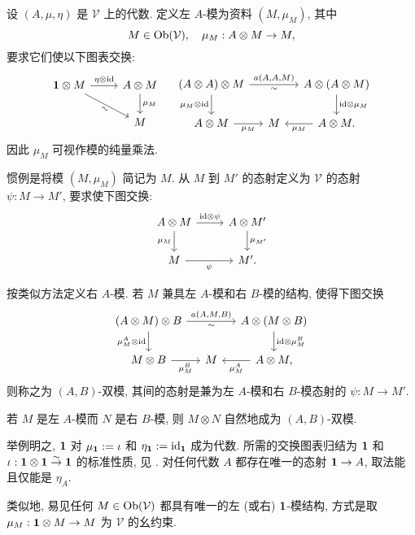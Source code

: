 \begin{definition}[模]\label{def:module-algebra}
	设 $(A, \mu, \eta)$ 是 $\mathcal{V}$ 上的代数. 定义左 $A$-模为资料 $(M, \mu_M)$, 其中
	\[ M \in \operatorname{Ob}(\mathcal{V}), \quad \mu_M: A \otimes M \to M, \]
	要求它们使以下图表交换:
	\[\begin{tikzcd}
		\munit \otimes M \arrow[r, "{\eta \otimes \identity}"] \arrow[rd, "\sim"' sloped] & A \otimes M \arrow[d, "{\mu_M}"] \\
		& M
	\end{tikzcd} \quad \begin{tikzcd}[column sep=small]
		(A \otimes A) \otimes M \arrow[rr, "{a(A, A, M)}", "\sim"'] \arrow[d, "{\mu_M \otimes \identity}"'] & & A \otimes (A \otimes M) \arrow[d, "{\identity \otimes \mu_M}"] \\
		A \otimes M \arrow[r, "{\mu_M}"'] & M & A \otimes M \arrow[l, "{\mu_M}"] .
	\end{tikzcd}\]
	因此 $\mu_M$ 可视作模的纯量乘法.
	
	惯例是将模 $(M, \mu_M)$ 简记为 $M$. 从 $M$ 到 $M'$ 的态射定义为 $\mathcal{V}$ 的态射 $\psi: M \to M'$, 要求使下图交换:
	\[\begin{tikzcd}
		A \otimes M \arrow[d, "{\mu_M}"'] \arrow[r, "{\identity \otimes \psi}"] & A \otimes M' \arrow[d, "{\mu_{M'}}"] \\
		M \arrow[r, "\psi"'] & M' .
	\end{tikzcd}\]
	
	按类似方法定义右 $A$-模. 若 $M$ 兼具左 $A$-模和右 $B$-模的结构, 使得下图交换
	\[\begin{tikzcd}[column sep=small]
		(A \otimes M) \otimes B \arrow[rr, "{a(A, M, B)}", "\sim"'] \arrow[d, "{\mu_M^A \otimes \identity}"'] & & A \otimes (M \otimes B) \arrow[d, "{\identity \otimes \mu_M^B}"] \\
		M \otimes B \arrow[r, "{\mu_M^B}"'] & M & A \otimes M , \arrow[l, "{\mu_M^A}"]
	\end{tikzcd}\]
	则称之为 $(A, B)$-双模, 其间的态射是兼为左 $A$-模和右 $B$-模态射的 $\psi: M \to M'$.
\end{definition}

若 $M$ 是左 $A$-模而  $N$ 是右 $B$-模, 则 $M \otimes N$ 自然地成为 $(A, B)$-双模.

\begin{remark}[幺元作为代数]\label{rem:unit-algebra}
	举例明之, $\bm{1}$ 对 $\mu_{\bm{1}} := \iota$ 和 $\eta_{\bm{1}} := \mathrm{id}_{\bm{1}}$ 成为代数. 所需的交换图表归结为 $\bm{1}$ 和 $\iota: \bm{1} \otimes \bm{1} \stackrel{\sim}{\rightarrow} \bm{1}$ 的标准性质, 见 \cite[引理 3.1.5]{Li1}. 对任何代数 $A$ 都存在唯一的态射 $\bm{1} \to A$, 取法能且仅能是 $\eta_A$.
	
	类似地, 易见任何 $M \in \operatorname{Ob}(\mathcal{V})$ 都具有唯一的左 (或右) $\bm{1}$-模结构, 方式是取 $\mu_M: \bm{1} \otimes M \to M$ 为 $\mathcal{V}$ 的幺约束.
\end{remark}

